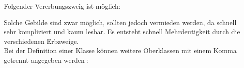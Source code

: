 Folgender Vererbungszweig ist möglich:\\
\noindent
\begin{minipage}{0.5\columnwidth}
    \begin{center}
    \end{center}  
\end{minipage}
\begin{minipage}{0.5\columnwidth}
Solche Gebilde sind zwar möglich, sollten jedoch vermieden werden, da schnell sehr kompliziert und kaum lesbar. 
Es entsteht schnell Mehrdeutigkeit durch die verschiedenen Erbzweige.\\
Bei der Definition einer Klasse können weitere Oberklassen mit einem Komma getrennt angegeben werden :

\end{minipage}

